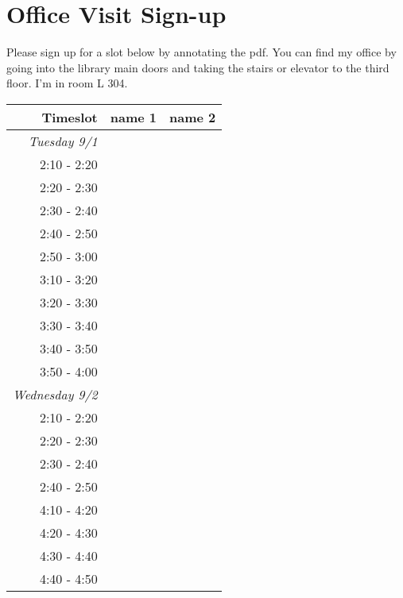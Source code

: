 \documentclass{article}
\begin{document}
\section*{Office Visit Sign-up}

Please sign up for a slot below by annotating the pdf. You can find my office by
going into the library main doors and taking the stairs or elevator to the third
floor. I'm in room L 304.

\vspace{15mm}

\bgroup
\def\arraystretch{1.7}
\begin{tabular}{ r | c | c }
  \textbf{Timeslot} & \textbf{name 1} & \textbf{name 2} \\ \hline \hline
  \emph{Tuesday 9/1} & \hspace{40mm} & \hspace{40mm} \\
  2:10 - 2:20 & & \\ \hline
  2:20 - 2:30 & & \\ \hline
  2:30 - 2:40 & & \\ \hline
  2:40 - 2:50 & & \\ \hline
  2:50 - 3:00 & & \\ \hline
  3:10 - 3:20 & & \\ \hline
  3:20 - 3:30 & & \\ \hline
  3:30 - 3:40 & & \\ \hline
  3:40 - 3:50 & & \\ \hline
  3:50 - 4:00 & & \\ \hline \hline
  
  \emph{Wednesday 9/2} & \hspace{40mm} & \hspace{40mm} \\
  2:10 - 2:20 & & \\ \hline
  2:20 - 2:30 & & \\ \hline
  2:30 - 2:40 & & \\ \hline
  2:40 - 2:50 & & \\ \hline
  4:10 - 4:20 & & \\ \hline
  4:20 - 4:30 & & \\ \hline
  4:30 - 4:40 & & \\ \hline
  4:40 - 4:50 & & \\ \hline
  \end{tabular}
\egroup
\end{document}
